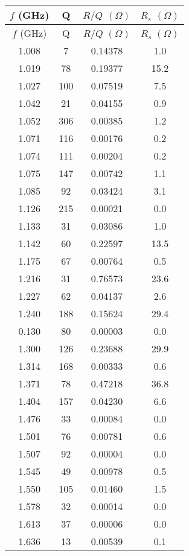 \begin{longtable}{c | c | c | c} 
\endfirsthead$f$ (GHz) & Q & $R/Q$ $(\Omega)$ & $R_{s}$ $(\Omega)$ \\
              \endhead$f$ (GHz) & Q & $R/Q$ $(\Omega)$ & $R_{s}$ $(\Omega)$ \\ \hline 
1.008 &    7 & 0.14378 &  1.0 \\ \hline 
1.019 &   78 & 0.19377 & 15.2 \\ \hline 
1.027 &  100 & 0.07519 &  7.5 \\ \hline 
1.042 &   21 & 0.04155 &  0.9 \\ \hline 
1.052 &  306 & 0.00385 &  1.2 \\ \hline 
1.071 &  116 & 0.00176 &  0.2 \\ \hline 
1.074 &  111 & 0.00204 &  0.2 \\ \hline 
1.075 &  147 & 0.00742 &  1.1 \\ \hline 
1.085 &   92 & 0.03424 &  3.1 \\ \hline 
1.126 &  215 & 0.00021 &  0.0 \\ \hline 
1.133 &   31 & 0.03086 &  1.0 \\ \hline 
1.142 &   60 & 0.22597 & 13.5 \\ \hline 
1.175 &   67 & 0.00764 &  0.5 \\ \hline 
1.216 &   31 & 0.76573 & 23.6 \\ \hline 
1.227 &   62 & 0.04137 &  2.6 \\ \hline 
1.240 &  188 & 0.15624 & 29.4 \\ \hline 
0.130 &   80 & 0.00003 &  0.0 \\ \hline 
1.300 &  126 & 0.23688 & 29.9 \\ \hline 
1.314 &  168 & 0.00333 &  0.6 \\ \hline 
1.371 &   78 & 0.47218 & 36.8 \\ \hline 
1.404 &  157 & 0.04230 &  6.6 \\ \hline 
1.476 &   33 & 0.00084 &  0.0 \\ \hline 
1.501 &   76 & 0.00781 &  0.6 \\ \hline 
1.507 &   92 & 0.00004 &  0.0 \\ \hline 
1.545 &   49 & 0.00978 &  0.5 \\ \hline 
1.550 &  105 & 0.01460 &  1.5 \\ \hline 
1.578 &   32 & 0.00014 &  0.0 \\ \hline 
1.613 &   37 & 0.00006 &  0.0 \\ \hline 
1.636 &   13 & 0.00539 &  0.1 \\ \hline 

\end{longtable}
